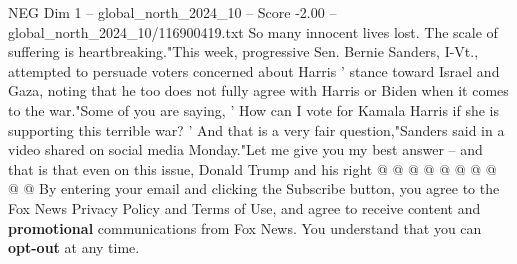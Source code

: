 \begin{textsample}{NEG Dim 1 – global\_north\_2024\_10 – Score -2.00 – global\_north\_2024\_10/116900419.txt}
So many innocent lives lost.
The scale of suffering is heartbreaking."This week, progressive Sen.
Bernie Sanders, I-Vt., attempted to persuade voters concerned about Harris ' stance toward Israel and Gaza, noting that he too does not fully agree with Harris or Biden when it comes to the war."Some of you are saying, ' How can I vote for Kamala Harris if she is supporting this terrible war? ' And that is a very fair question,"Sanders said in a video shared on social media Monday."Let me give you my best answer -- and that is that even on this issue, Donald Trump and his right @ @ @ @ @ @ @ @ @ @ By entering your email and clicking the Subscribe button, you agree to the Fox News Privacy Policy and Terms of Use, and agree to receive content and \textbf{promotional} communications from Fox News.
You understand that you can \textbf{opt-out} at any time.

\end{textsample}
